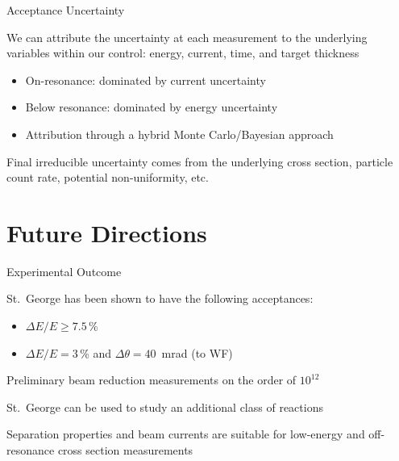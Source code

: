 \documentclass[10pt]{beamer}
\begin{document}
\begin{frame}[fragile]{Acceptance Uncertainty}

    We can attribute the uncertainty at each measurement to the
    underlying variables within our control: energy, current, time, and
    target thickness
    \begin{itemize}
        \item On-resonance: dominated by current uncertainty
        \item Below resonance: dominated by energy uncertainty
        \item Attribution through a hybrid Monte Carlo/Bayesian
            approach
    \end{itemize}

    Final irreducible uncertainty comes from the underlying cross
    section, particle count rate, potential non-uniformity, etc.

\end{frame}






\section{Future Directions}

\begin{frame}[fragile]{Experimental Outcome}

    St.\ George has been shown to have the following acceptances:
    \begin{itemize}
        \item $\Delta E/E \geq 7.5$\,\%
        \item $\Delta E/E = 3$\,\% and $\Delta\theta = 40$~mrad (to WF)
    \end{itemize}

    Preliminary beam reduction measurements on the order of $10^{12}$

    St.\ George can be used to study an additional class of reactions

    Separation properties and beam currents are suitable for low-energy
    and off-resonance cross section measurements

\end{frame}
\end{document}
